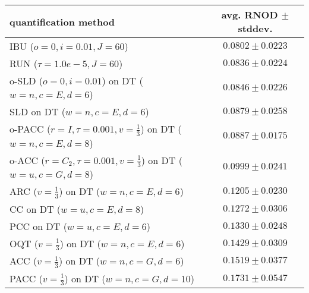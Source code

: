 \begin{tabular}{lc}
  \toprule
  quantification method & avg. RNOD $\pm$ stddev. \\
  \midrule
  IBU ($o=0, i=0.01, J=60$) & $\mathbf{0.0802 \pm 0.0223}$ \\
  RUN ($\tau=1.0e-5, J=60$) & $0.0836 \pm 0.0224$ \\
  o-SLD ($o=0, i=0.01$) on DT ($w=n, c=E, d=6$) & $0.0846 \pm 0.0226$ \\
  SLD on DT ($w=n, c=E, d=6$) & $0.0879 \pm 0.0258$ \\
  o-PACC ($r=I, \tau=0.001, v=\frac{1}{3}$) on DT ($w=n, c=E, d=8$) & $0.0887 \pm 0.0175$ \\
  o-ACC ($r=C_2, \tau=0.001, v=\frac{1}{3}$) on DT ($w=u, c=G, d=8$) & $0.0999 \pm 0.0241$ \\
  ARC ($v=\frac{1}{3}$) on DT ($w=n, c=E, d=6$) & $0.1205 \pm 0.0230$ \\
  CC on DT ($w=u, c=E, d=8$) & $0.1272 \pm 0.0306$ \\
  PCC on DT ($w=u, c=E, d=6$) & $0.1330 \pm 0.0248$ \\
  OQT ($v=\frac{1}{3}$) on DT ($w=n, c=E, d=6$) & $0.1429 \pm 0.0309$ \\
  ACC ($v=\frac{1}{3}$) on DT ($w=n, c=G, d=6$) & $0.1519 \pm 0.0377$ \\
  PACC ($v=\frac{1}{3}$) on DT ($w=n, c=G, d=10$) & $0.1731 \pm 0.0547$ \\
  \bottomrule
\end{tabular}
